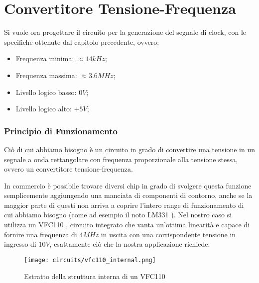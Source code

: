 \chapter{Convertitore Tensione-Frequenza}


Si vuole ora progettare il circuito per la generazione del segnale di clock, con le
specifiche ottenute dal capitolo precedente, ovvero:

\begin{itemize}
    \item Frequenza minima: $\approx 14kHz$;
    \item Frequenza massima: $\approx 3.6MHz$;
    \item Livello logico basso: $0V$;
    \item Livello logico alto: $+5V$;
\end{itemize}


\subsection*{Principio di Funzionamento}


Ciò di cui abbiamo bisogno è un circuito in grado di convertire una tensione in un segnale
a onda rettangolare con frequenza proporzionale alla tensione stessa, ovvero un convertitore
tensione-frequenza.

In commercio è possibile trovare diversi chip in grado di svolgere questa funzione
semplicemente aggiungendo una manciata di componenti di contorno, anche se la maggior
parte di questi non arriva a coprire l'intero range di funzionamento di cui abbiamo bisogno
(come ad esempio il noto LM331 \cite{lm331}). Nel nostro caso si utilizza un VFC110
\cite{vfc110}, circuito integrato che vanta un'ottima linearità e capace di fornire una
frequenza di $4MHz$ in uscita con una corrispondente tensione in ingresso di $10V$,
esattamente ciò che la nostra applicazione richiede.
\medskip

\begin{figure}[ht]
    \centering
    \texttt{[image: circuits/vfc110\_internal.png]}
    \caption{Estratto della struttura interna di un VFC110}
    \label{vfc100_internal}
\end{figure}

